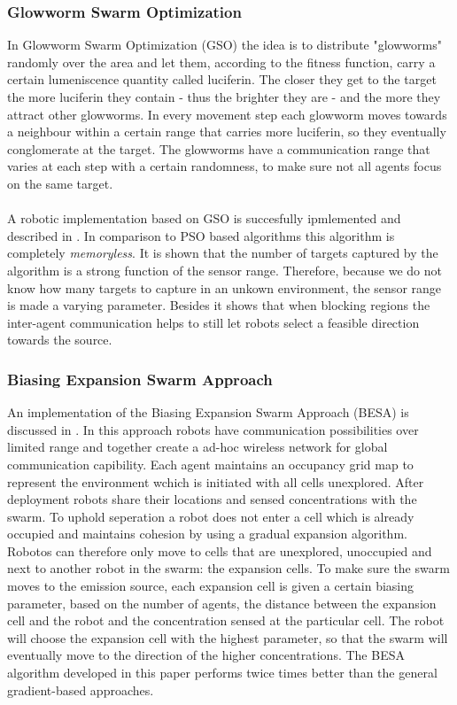 	\subsubsection{Glowworm Swarm Optimization}
		In Glowworm Swarm Optimization (GSO) the idea is to distribute "glowworms" randomly over the area and let them, according to the fitness function, carry a certain lumeniscence quantity called luciferin. 
		The closer they get to the target the more luciferin they contain - thus the brighter they are - and the more they attract other glowworms. 
		In every movement step each glowworm moves towards a neighbour within a certain range that carries more luciferin, so they eventually conglomerate at the target. 
		The glowworms have a communication range that varies at each step with a certain randomness, to make sure not all agents focus on the same target. \cite{krishnanand2006glowworm}\\
		\\
		A robotic implementation based on GSO is succesfully ipmlemented and described in \cite{krishnanand2005detection}.
		In comparison to PSO based algorithms this algorithm is completely \emph{memoryless}.
		It is shown that the number of targets captured by the algorithm is a strong function of the sensor range.
		Therefore, because we do not know how many targets to capture in an unkown environment, the sensor range is made a varying parameter.
		Besides it shows that when blocking regions the inter-agent communication helps to still let robots select a feasible direction towards the source.

	\subsubsection{Biasing Expansion Swarm Approach}
		An implementation of the Biasing Expansion Swarm Approach (BESA) is discussed in \cite{cui2004swarm}.
		In this approach robots have communication possibilities over limited range and together create a ad-hoc wireless network for global communication capibility.
		Each agent maintains an occupancy grid map to represent the environment wchich is initiated with all cells unexplored.
		After deployment robots share their locations and sensed concentrations with the swarm.
		To uphold seperation a robot does not enter a cell which is already occupied and maintains cohesion by using a gradual expansion algorithm.
		Robotos can therefore only move to cells that are unexplored, unoccupied and next to another robot in the swarm: the expansion cells.
		To make sure the swarm moves to the emission source, each expansion cell is given a certain biasing parameter, based on the number of agents, the distance between the expansion cell and the robot and the concentration sensed at the particular cell.
		The robot will choose the expansion cell with the highest parameter, so that the swarm will eventually move to the direction of the higher concentrations.
		The BESA algorithm developed in this paper performs twice times better than the general gradient-based approaches.

